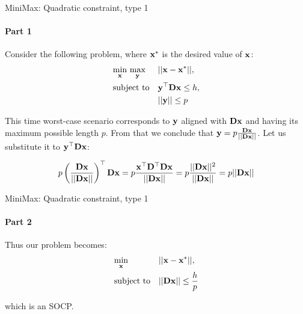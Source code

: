 \documentclass{beamer}
\begin{document}
\begin{frame}{MiniMax: Quadratic constraint, type 1}
\framesubtitle{Part 1}
\begin{flushleft}

Consider the following problem, where $\mathbf{x}^*$ is the desired value of $\mathbf{x}$:
%
\begin{equation}
\begin{aligned}
& \underset{\mathbf{x}}{\text{min}} \ \underset{\mathbf{y}}{\text{max}}
& & ||\mathbf{x} - \mathbf{x}^*||, \\
& \text{subject to}
& & \mathbf{y}^\top \mathbf{D} \mathbf{x} \leq h, \\
& & & ||\mathbf{y}|| \leq p
\end{aligned}
\end{equation}

This time worst-case scenario corresponds to $\mathbf{y}$ aligned with $\mathbf{D} \mathbf{x}$ and having its maximum possible length $p$. From that we conclude that $\mathbf{y} = p \frac{\mathbf{D} \mathbf{x}}{|| \mathbf{D} \mathbf{x} ||} $. Let us substitute it to $\mathbf{y}^\top \mathbf{D} \mathbf{x}$:

\begin{equation}
    p \left( \frac{\mathbf{D} \mathbf{x}}{|| \mathbf{D} \mathbf{x} ||} \right)^\top \mathbf{D} \mathbf{x} =
    p \frac{\mathbf{x}^\top \mathbf{D}^\top \mathbf{D} \mathbf{x}}{|| \mathbf{D} \mathbf{x} ||} = 
    p \frac{|| \mathbf{D} \mathbf{x} ||^2}{|| \mathbf{D} \mathbf{x} ||} = 
    p || \mathbf{D} \mathbf{x} ||
\end{equation}
 
\end{flushleft}
\end{frame}



\begin{frame}{MiniMax: Quadratic constraint, type 1}
\framesubtitle{Part 2}
\begin{flushleft}

Thus our problem becomes:
%
\begin{equation}
\begin{aligned}
& \underset{\mathbf{x}}{\text{min}}
& & ||\mathbf{x} - \mathbf{x}^*||, \\
& \text{subject to}
& & || \mathbf{D} \mathbf{x} || \leq \frac{h}{p}
\end{aligned}
\end{equation}

which is an SOCP.

\end{flushleft}
\end{frame}
\end{document}
